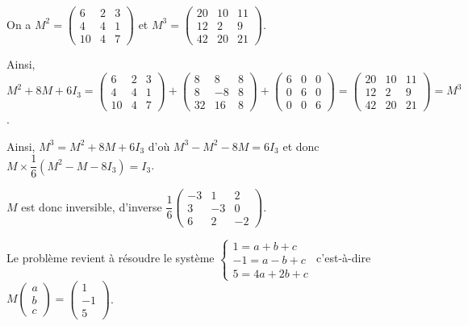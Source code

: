 \documentclass[11pt,fleqn]{book} %
\begin{document}
\begin{solution}
On a $M^2=\begin{pmatrix}6&2&3\\4&4&1\\10&4&7\end{pmatrix}$ et $M^3=\begin{pmatrix}20&10&11\\12&2&9\\42&20&21\end{pmatrix}$.

Ainsi, $M^2+8M+6I_3=\begin{pmatrix}6&2&3\\4&4&1\\10&4&7\end{pmatrix}+\begin{pmatrix}8&8&8\\8&-8&8\\32&16&8\end{pmatrix}+\begin{pmatrix}6&0&0\\0&6&0\\0&0&6\end{pmatrix}=\begin{pmatrix}20&10&11\\12&2&9\\42&20&21\end{pmatrix}=M^3$.

Ainsi, $M^3=M^2+8M+6I_3$ d'où $M^3-M^2-8M=6I_3$ et donc $M\times \dfrac{1}{6}(M^2-M-8I_3)=I_3$.

$M$ est donc inversible, d'inverse $\dfrac{1}{6}\begin{pmatrix}-3&1&2\\ 3&-3&0\\ 6&2&-2\end{pmatrix}$.

Le problème revient à résoudre le système $\left\{\begin{array}{l}1=a+b+c \\ -1 = a-b+c \\ 5 = 4a+2b+c\end{array}\right.$ c'est-à-dire $M\begin{pmatrix}a\\b\\c\end{pmatrix}=\begin{pmatrix}1\\-1\\5\end{pmatrix}$.


\end{solution}
\end{document}
